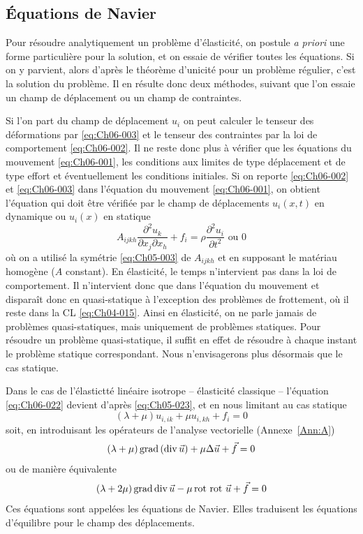 \subsection{Équations de Navier}
Pour résoudre analytiquement un problème d'élasticité, on postule \textit{a priori} une forme particulière pour la solution, et on essaie de vérifier toutes les équations.
Si on y parvient, alors d'après le théorème d'unicité pour un problème régulier, c'est la solution du problème.
Il en résulte donc deux méthodes, suivant que l'on essaie un champ de déplacement ou un champ de contraintes.

Si l'on part du champ de déplacement $u_i$ on peut calculer le tenseur des déformations par \eqref{eq:Ch06-003} et le tenseur des contraintes par la loi de comportement \eqref{eq:Ch06-002}.
Il ne reste donc plus à vérifier que les équations du mouvement \eqref{eq:Ch06-001}, les conditions aux limites de type déplacement et de type effort et éventuellement les conditions initiales.
Si on reporte \eqref{eq:Ch06-002} et \eqref{eq:Ch06-003} dans l'équation du mouvement \eqref{eq:Ch06-001}, on obtient l'équation qui doit être vérifiée par le champ de déplacements $u_i\left( x,t \right)$ en dynamique ou $u_i(x)$ en statique
\begin{equation}
    A_{ijkh} \frac{\partial^2 u_k}{\partial x_j \partial x_h} + f_i = \rho \frac{\partial^2 u_i}{\partial t^2} \text{ ou } 0
    \label{eq:Ch06-022}
\end{equation}
où on a utilisé la symétrie \eqref{eq:Ch05-003} de $A_{ijkh}$ et en supposant le matériau homogène ($A$ constant).
En élasticité, le temps n'intervient pas dans la loi de comportement.
Il n'intervient donc que dans l'équation du mouvement et disparaît donc en quasi-statique à l'exception des problèmes de frottement, où il reste dans la CL \eqref{eq:Ch04-015}.
Ainsi en élasticité, on ne parle jamais de problèmes quasi-statiques, mais uniquement de problèmes statiques.
Pour résoudre un problème quasi-statique, il suffit en effet de résoudre à chaque instant le problème statique correspondant.
Nous n'envisagerons plus désormais que le cas statique.

Dans le cas de l'élastictté linéaire isotrope -- élasticité classique -- l'équation \eqref{eq:Ch06-022} devient d'après \eqref{eq:Ch05-023}, et en nous limitant au cas statique
\begin{equation}
    \left( \lambda + \mu \right) u_{i,ik} + \mu u_{i,kh} + f_i = 0
    \label{eq:Ch06-023}
\end{equation}
soit, en introduisant les opérateurs de l'analyse vectorielle (Annexe~\ref{Ann:A})
\begin{equation}
    \left( \lambda + \mu \right) \operatorname*{\mathrm{grad}} \left( \operatorname*{\mathrm{div}} \vec{u} \right) + \mu \Delta \vec{u} + \vec{f} = 0
    \label{eq:Ch06-024}
\end{equation}
ou de manière équivalente
\begin{equation}
    \left( \lambda + 2\mu \right) \operatorname*{\mathrm{grad}} \operatorname*{\mathrm{div}} \vec{u} - \mu \operatorname*{\mathrm{rot}\,} \operatorname*{\mathrm{rot}\,} \vec{u} + \vec{f} = 0
    \label{eq:Ch06-025}
\end{equation}
Ces équations sont appelées les équations de Navier.
Elles traduisent les équations d'équilibre pour le champ des déplacements.

